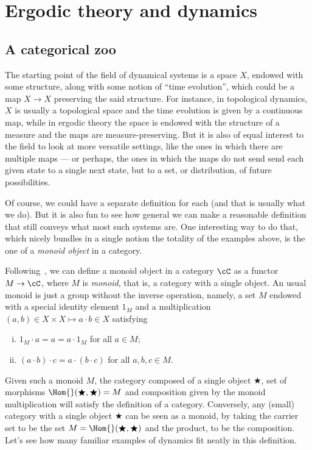 \documentclass[../main]{subfiles}
\begin{document}
\chapter{Ergodic theory and dynamics}

\section{A categorical zoo}
The starting point of the field of dynamical systems is a space \(X\), endowed with some structure, along with some notion of ``time evolution'', which could be a map \(X \to X\) preserving the said structure. For instance, in topological dynamics, \(X\) is usually a topological space and the time evolution is given by a continuous map, while in ergodic theory the space is endowed with the structure of a measure and the maps are measure-preserving. But it is also of equal interest to the field to look at more versatile settings, like the ones in which there are multiple maps --- or perhaps, the ones in which the maps do not send send each given state to a single next state, but to a set, or distribution, of future possibilities.

Of course, we could have a separate definition for each (and that is usually what we do). But it is also fun to see how general we can make a reasonable definition that still conveys what most such systems are. One interesting way to do that, which nicely bundles in a single notion the totality of the examples above, is the one of a \emph{monoid object} in a category. 

Following~\cite{mossCategorytheoreticProofErgodic2023}, we can define a monoid object in a category \(\cC\) as a functor \(M \to \cC\), where \(M\) is \emph{monoid}, that is, a category with a single object. An usual monoid is just a group without the inverse operation, namely, a set \(M\) endowed with a special identity element \(1_M\) and a multiplication \((a,b) \in X \times X \mapsto a \cdot b \in X\) satisfying
 
\begin{enumerate}[i.]
\item \(1_M \cdot a = a = a \cdot 1_M\) for all \(a \in M\);
\item \((a \cdot b) \cdot c = a \cdot (b \cdot c)\) for all \(a, b, c \in M\).
\end{enumerate}
Given such a monoid \(M\), the category composed of a single object \(\bigstar\), set of morphisms \(\Hom{}(\bigstar, \bigstar) = M\) and composition given by the monoid multiplication will satisfy the definition of a category. Conversely, any (small) category with a single object \(\bigstar\) can be seen as a monoid, by taking the carrier set to be the set \(M = \Hom{}(\bigstar, \bigstar)\) and the product, to be the composition. Let's see how many familiar examples of dynamics fit neatly in this definition.
\end{document}
